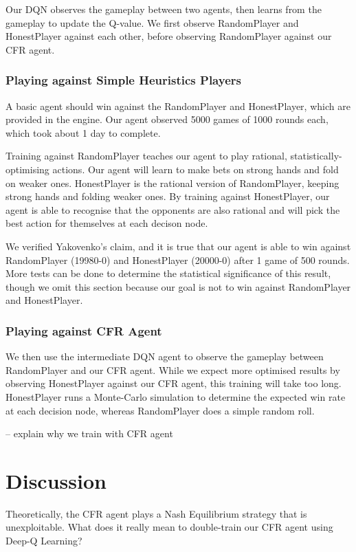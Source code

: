 \documentclass{article}
\begin{document}
Our DQN observes the gameplay between two agents, then learns from the gameplay to update the Q-value. We first observe RandomPlayer and HonestPlayer against each other, before observing RandomPlayer against our CFR agent.

\subsubsection{Playing against Simple Heuristics Players}
A basic agent should win against the RandomPlayer and HonestPlayer, which are provided in the engine. Our agent observed 5000 games of 1000 rounds each, which took about 1 day to complete.

Training against RandomPlayer teaches our agent to play rational, statistically-optimising actions. Our agent will learn to make bets on strong hands and fold on weaker ones. HonestPlayer is the rational version of RandomPlayer, keeping strong hands and folding weaker ones. By training against HonestPlayer, our agent is able to recognise that the opponents are also rational and will pick the best action for themselves at each decison node.

We verified Yakovenko's claim, and it is true that our agent is able to win against RandomPlayer (19980-0) and HonestPlayer (20000-0) after 1 game of 500 rounds. More tests can be done to determine the statistical significance of this result, though we omit this section because our goal is not to win against RandomPlayer and HonestPlayer.

\subsubsection{Playing against CFR Agent}

We then use the intermediate DQN agent to observe the gameplay between RandomPlayer and our CFR agent. While we expect more optimised results by observing HonestPlayer against our CFR agent, this training will take too long. HonestPlayer runs a Monte-Carlo simulation to determine the expected win rate at each decision node, whereas RandomPlayer does a simple random roll.

-- explain why we train with CFR agent

\section{Discussion}
Theoretically, the CFR agent plays a Nash Equilibrium strategy that is unexploitable. What does it really mean to double-train our CFR agent using Deep-Q Learning?
\end{document}
